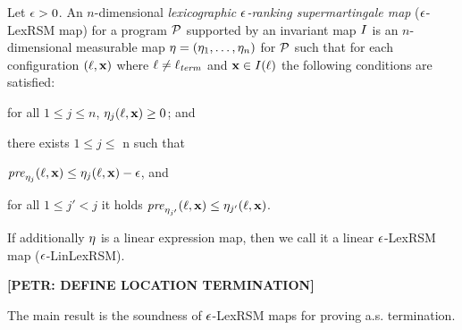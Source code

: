 \begin{definition}
Let $\epsilon>0$. An $n$-dimensional \emph{lexicographic $\epsilon$-ranking supermartingale map} ($\epsilon$-LexRSM map) for a program $\mathcal{P}$ supported by an invariant map $I$ is an $n$-dimensional measurable map $\mathbf{\eta}=(\eta_1,\dots,\eta_n)$ for $\mathcal{P}$ such that for each configuration $(\ell,\mathbf{x})$ where $\ell\neq \ell_{\mathit{term}}$ and $\mathbf{x}\in I(\ell)$ the following conditions are satisfied:
 \begin{compactitem}
 	\item
 	for all $1\leq j \leq n$, $\eta_j(\ell,\mathbf{x})\geq 0$; and
 	\item 
 	there exists $1\leq j \leq$ n such that
 	\begin{compactitem}
 	\item
 	$\mathit{pre}_{\eta_j}(\ell,\mathbf{x}) \leq \eta_j(\ell,\mathbf{x})-\epsilon$, and
 	\item
 	for all $1\leq j'<j$ it holds 
 	$\mathit{pre}_{\eta_{j'}}(\ell,\mathbf{x}) \leq \eta_{j'}(\ell,\mathbf{x})$.
 	\end{compactitem}
 \end{compactitem}
If additionally $\eta$ is a linear expression map, then we call it a linear $\epsilon$-LexRSM map ($\epsilon$-LinLexRSM).
\end{definition}

\textbf{[PETR: DEFINE LOCATION TERMINATION]}

The main result is the soundness of $\epsilon$-LexRSM maps for proving a.s. 
termination.

